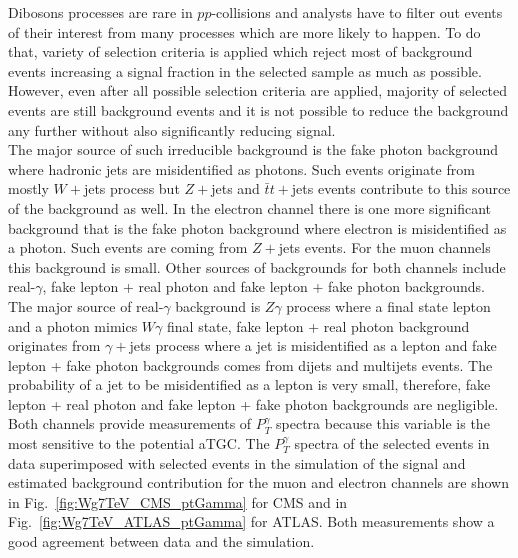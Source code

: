 
Dibosons processes are rare in $pp$-collisions and analysts have to filter out events of their interest from many processes which are more likely to happen. To do that, variety of selection criteria is applied which reject most of background events increasing a signal fraction in the selected sample as much as possible. However, even after all possible selection criteria are applied, majority of selected events are still background events and it is not possible to reduce the background any further without also significantly reducing signal.\\

The major source of such irreducible background is the fake photon background where hadronic jets are misidentified as photons. Such events originate from mostly $W+$jets process but $Z+$jets and $\bar{t}t+$jets events contribute to this source of the background as well. In the electron channel there is one more significant background that is the fake photon background where electron is misidentified as a photon.  Such events are coming from $Z+$jets events. For the muon channels this background is small. Other sources of backgrounds for both channels include real-$\gamma$, fake lepton + real photon and fake lepton + fake photon backgrounds. The major source of real-$\gamma$ background is $Z\gamma$ process where a final state lepton and a photon mimics $W\gamma$ final state, fake lepton + real photon background originates from $\gamma+$jets process where a jet is misidentified as a lepton and fake lepton + fake photon backgrounds comes from dijets and multijets events. The probability of a jet to be misidentified as a lepton is very small, therefore, fake lepton + real photon and fake lepton + fake photon backgrounds are negligible.\\

Both channels provide measurements of $P_T^\gamma$ spectra because this variable is the most sensitive to the potential aTGC. The $P_T^\gamma$ spectra of the selected events in data superimposed with selected events in the simulation of the signal and estimated background contribution for the muon and electron channels are shown in Fig.~\ref{fig:Wg7TeV_CMS_ptGamma} for CMS and in Fig.~\ref{fig:Wg7TeV_ATLAS_ptGamma} for ATLAS. Both measurements show a good agreement between data and the simulation.\\

